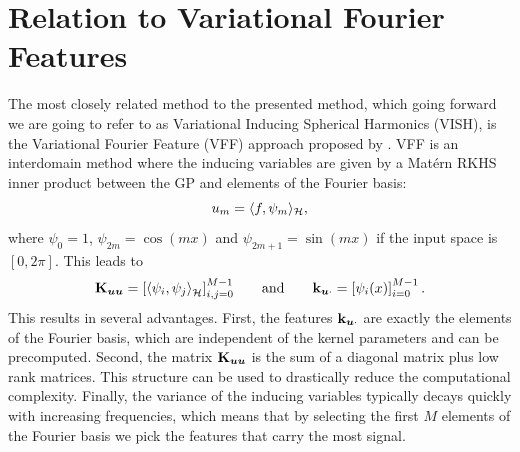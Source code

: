 \section{Relation to Variational Fourier Features}
\label{sec:vff-vs-vish}

The most closely related method to the presented method, which going forward we are going to refer to as Variational Inducing Spherical Harmonics (VISH), is the Variational Fourier Feature (VFF) approach proposed by \citet{hensman2017variational}. VFF is an interdomain method where the inducing variables are given by a Mat\'ern RKHS inner product between the GP and elements of the Fourier basis:
\begin{equation}
u_m = \langle f, \psi_m \rangle_{{\mathcal{H}}},
\end{equation}
where $\psi_0 = 1$, $\psi_{2m}=\cos(m x)$ and $\psi_{2m+1}=\sin(m x)$ if the input space is $[0, 2 \pi]$. This leads to
\begin{equation}
    \Kuu = \left[\langle \psi_i , \psi_{j} \rangle_\rkhs^{} \right]_{i, j = 0}^{M-1}\qquad\text{and}\qquad\kux = \left[ \psi_i(x)\right]_{i = 0}^{M-1}\, .
\end{equation}
This results in several advantages. First, the features $\mathbf{k}_{\bm{u} \cdot}$ are exactly the elements of the Fourier basis, which are independent of the kernel parameters and can be precomputed. Second, the matrix $\mathbf{{K}}_{\bm{u} \bm{u}}$ is the sum of a diagonal matrix plus low rank matrices. This structure can be used to drastically reduce the computational complexity. Finally, the variance of the inducing variables typically decays quickly with increasing frequencies, which means that by selecting the first $M$ elements of the Fourier basis we pick the features that carry the most signal.

